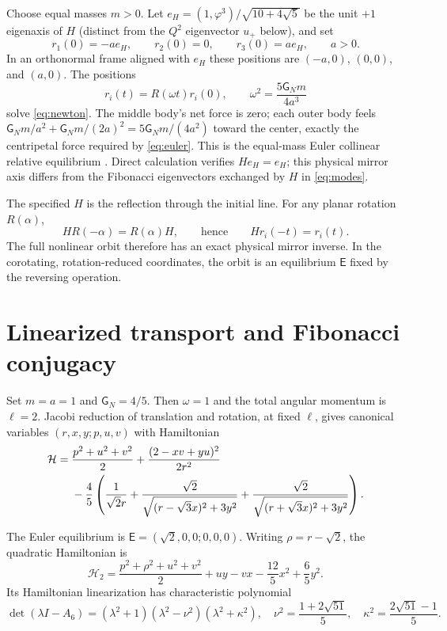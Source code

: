 \documentclass[11pt,letterpaper]{article}
\theoremstyle{paper}
\newcommand{\GN}{\mathsf G_{\!N}}
\newcommand{\euler}{\mathsf E}
\begin{document}
Choose equal masses $m>0$. Let $e_H=(1,\varphi^3)/\sqrt{10+4\sqrt5}$ be the unit $+1$ eigenaxis of $H$ (distinct from the $Q^2$ eigenvector $u_+$ below), and set
\begin{equation}
r_1(0)=-ae_H,\qquad r_2(0)=0,\qquad r_3(0)=ae_H,\qquad a>0.
\end{equation}
In an orthonormal frame aligned with $e_H$ these positions are $(-a,0)$, $(0,0)$, and $(a,0)$.
The positions
\begin{equation}
\boxed{r_i(t)=R(\omega t)r_i(0),\qquad
\omega^2=\frac{5\GN m}{4a^3}}
\label{eq:euler}
\end{equation}
solve \eqref{eq:newton}. The middle body's net force is zero; each outer body feels $\GN m/a^2+\GN m/(2a)^2=5\GN m/(4a^2)$ toward the center, exactly the centripetal force required by \eqref{eq:euler}. This is the equal-mass Euler collinear relative equilibrium \cite{broucke,yamada}. Direct calculation verifies $He_H=e_H$; this physical mirror axis differs from the Fibonacci eigenvectors exchanged by $H$ in \eqref{eq:modes}.

The specified $H$ is the reflection through the initial line. For any planar rotation $R(\alpha)$,
\begin{equation}
HR(-\alpha)=R(\alpha)H,
\qquad\text{hence}\qquad
\boxed{Hr_i(-t)=r_i(t).}
\label{eq:eulermirror}
\end{equation}
The full nonlinear orbit therefore has an exact physical mirror inverse. In the corotating, rotation-reduced coordinates, the orbit is an equilibrium $\euler$ fixed by the reversing operation.

\section{Linearized transport and Fibonacci conjugacy}

Set $m=a=1$ and $\GN=4/5$. Then $\omega=1$ and the total angular momentum is $\ell=2$. Jacobi reduction of translation and rotation, at fixed $\ell$, gives canonical variables $(r,x,y;p,u,v)$ with Hamiltonian
\begin{align}
\mathcal H={}&\frac{p^2+u^2+v^2}{2}+\frac{(2-xv+yu)^2}{2r^2} \notag\\
&-\frac45\left(\frac1{\sqrt2r}+
\frac{\sqrt2}{\sqrt{(r-\sqrt3x)^2+3y^2}}+
\frac{\sqrt2}{\sqrt{(r+\sqrt3x)^2+3y^2}}\right).
\label{eq:ham}
\end{align}

The Euler equilibrium is $\euler=(\sqrt2,0,0;0,0,0)$. Writing $\rho=r-\sqrt2$, the quadratic Hamiltonian is
\begin{equation}
\mathcal H_2=\frac{p^2+\rho^2+u^2+v^2}{2}+uy-vx-\frac{12}{5}x^2+\frac65y^2.
\label{eq:quad}
\end{equation}
Its Hamiltonian linearization has characteristic polynomial
\begin{equation}
\det(\lambda I-A_6)=(\lambda^2+1)(\lambda^2-\nu^2)(\lambda^2+\kappa^2),
\quad
\nu^2=\frac{1+2\sqrt{51}}5,\quad
\kappa^2=\frac{2\sqrt{51}-1}5.
\label{eq:spec}
\end{equation}
\end{document}
